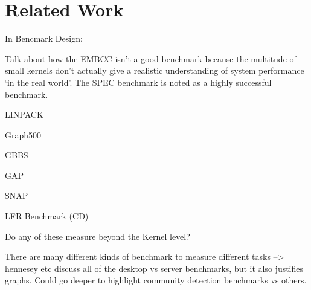 \renewcommand{\thechapter}{2}
\chapter{Related Work}
\label{chapter:20-Related-Work}

In Bencmark Design: 


\cite{Hennessy2019} Talk about how the EMBCC isn't a good benchmark because the multitude of small kernels don't actually give a realistic understanding of system performance `in the real world'. The SPEC benchmark is noted as a highly successful benchmark. 

LINPACK

Graph500

GBBS

GAP

SNAP

LFR Benchmark (CD)

Do any of these measure beyond the Kernel level? 

\cite{Hennessy2019} There are many different kinds of benchmark to measure different tasks --> hennesey etc discuss all of the desktop vs server benchmarks, but it also justifies graphs. Could go deeper to highlight community detection benchmarks vs others. 